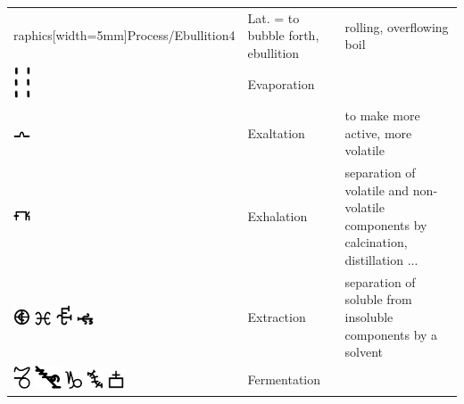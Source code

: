 \documentclass[british,final,landscape]{scrartcl}
\begin{document}
\begin{refsection}
\begin{supertabular}{p{0.3\textwidth}p{0.34\textwidth}p{0.34\textwidth}}
raphics[width=5mm]{Process/Ebullition4} & Lat.  = to bubble forth, ebullition & rolling, overflowing boil \\
   \includegraphics[width=5mm]{Process/Evaporation} & Evaporation & \\
   \includegraphics[width=5mm]{Process/Exaltation} & Exaltation & to make more active, more volatile \\
   \includegraphics[width=5mm]{Process/Exhalation} & Exhalation & separation of volatile and non-volatile components by calcination, distillation ... \\
   \includegraphics[width=5mm]{Process/Extract} \includegraphics[width=5mm]{Process/Extract2} \includegraphics[width=5mm]{Process/Extract3} \includegraphics[width=5mm]{Process/Extract4} & Extraction & separation of soluble from insoluble components by a solvent \\
   \includegraphics[width=5mm]{Process/Fermentation} \includegraphics[width=8mm]{Process/Fermentation2} \includegraphics[width=5mm]{Process/Fermentation3} \includegraphics[width=5mm]{Process/Fermentation4} \includegraphics[width=5mm]{Process/Fermentation5} & Fermentation & \\

\end{supertabular}
\end{refsection}
\end{document}
